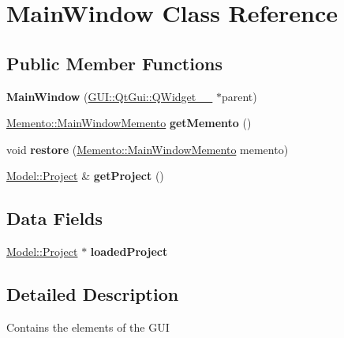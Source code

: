 \hypertarget{classGUI_1_1MainWindow}{}\section{Main\+Window Class Reference}
\label{classGUI_1_1MainWindow}
\subsection*{Public Member Functions}
\begin{DoxyCompactItemize}
\item 
\hypertarget{classGUI_1_1MainWindow_a6b91276653c1bd8cd1b256636d1270f7}{}{\bfseries Main\+Window} (\hyperlink{classGUI_1_1QtGui_1_1QWidget____10}{G\+U\+I\+::\+Qt\+Gui\+::\+Q\+Widget\+\_\+\+\_} $\ast$parent)\label{classGUI_1_1MainWindow_a6b91276653c1bd8cd1b256636d1270f7}

\item 
\hypertarget{classGUI_1_1MainWindow_ae085d92d1c5bec057a813bd86bc20fa4}{}\hyperlink{classMemento_1_1MainWindowMemento}{Memento\+::\+Main\+Window\+Memento} {\bfseries get\+Memento} ()\label{classGUI_1_1MainWindow_ae085d92d1c5bec057a813bd86bc20fa4}

\item 
\hypertarget{classGUI_1_1MainWindow_a72db05f1394dbeeb2a76b74d8f65917b}{}void {\bfseries restore} (\hyperlink{classMemento_1_1MainWindowMemento}{Memento\+::\+Main\+Window\+Memento} memento)\label{classGUI_1_1MainWindow_a72db05f1394dbeeb2a76b74d8f65917b}

\item 
\hypertarget{classGUI_1_1MainWindow_a0e9fe41bc141b89f4955329b959310eb}{}\hyperlink{classModel_1_1Project}{Model\+::\+Project} \& {\bfseries get\+Project} ()\label{classGUI_1_1MainWindow_a0e9fe41bc141b89f4955329b959310eb}

\end{DoxyCompactItemize}
\subsection*{Data Fields}
\begin{DoxyCompactItemize}
\item 
\hypertarget{classGUI_1_1MainWindow_a870e96d05ee2e8c616461952d01ac408}{}\hyperlink{classModel_1_1Project}{Model\+::\+Project} $\ast$ {\bfseries loaded\+Project}\label{classGUI_1_1MainWindow_a870e96d05ee2e8c616461952d01ac408}

\end{DoxyCompactItemize}


\subsection{Detailed Description}
Contains the elements of the G\+U\+I 